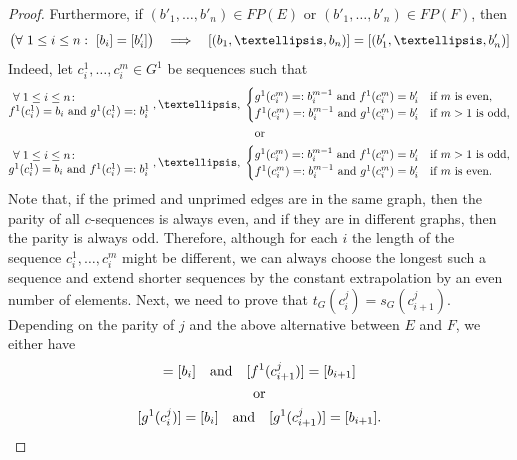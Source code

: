 \documentclass[10pt,a4paper]{amsart}
\def\text{\hbox}
\begin{document}
\begin{proof}
Furthermore, if $(b'_1,\ldots,b'_n)\in FP(E)$ or $(b'_1,\ldots,b'_n)\in FP(F)$, then 
\begin{equation}\label{implication}
\big{(}\forall~1\leq i\leq n:~[b_i]=[b'_i]\big{)}\quad \Longrightarrow\quad [(b_1,\ldots,b_n)]=[(b'_1,\ldots,b'_n)]
\end{equation}
Indeed, let $c^1_i,\ldots,c^{m}_i\in G^1$ be  sequences such that
\begin{gather}
\begin{matrix}
\forall\;1\leq i\leq n\colon\phantom{xxxxxxxxxx}\\
 f^1(c^1_i)=b_i\text{ and } g^1(c^1_i)=:b^1_i
\end{matrix}
\;,\ldots,\;
\begin{cases}
g^1(c^{m}_i)=:b^{m-1}_i\text{ and } f^1(c^{m}_i)=b'_i&\text{if $m$ is even},\\
f^1(c^{m}_i)=:b^{m-1}_i\text{ and } g^1(c^{m}_i)=b'_i&\text{if $m> 1$ is odd},
\end{cases}\nonumber\\
\text{or}\nonumber\\
\begin{matrix}
\forall\;1\leq i\leq n\colon\phantom{xxxxxxxxxx}\\
 g^1(c^1_i)=b_i\text{ and } f^1(c^1_i)=:b^1_i
\end{matrix}
\;,\ldots,\;
\begin{cases}
g^1(c^{m}_i)=:b^{m-1}_i\text{ and } f^1(c^{m}_i)=b'_i&\text{if $m>1$ is odd},\\
f^1(c^{m}_i)=:b^{m-1}_i\text{ and } g^1(c^{m}_i)=b'_i&\text{if $m$ is even}.
\end{cases}
\end{gather}
Note that, if the primed and unprimed edges are in the same graph, then the parity of all $c$-sequences is always even, and if they are in different graphs, then the parity is always odd. Therefore, although for each $i$ the length of the sequence $c^1_i,\ldots,c^{m}_i$ might be
different, we can always choose the longest such a sequence and extend shorter sequences by the constant extrapolation by an even number of elements. Next, we need to prove that $t_G(c^j_i)=s_G(c^j_{i+1})$. 
Depending on the parity of $j$ and the
above alternative between $E$ and $F$, we either have 
\begin{gather}
[f^1(c^j_i)]=[b_i]\quad\text{and}\quad [f^1(c^j_{i+1})]=[b_{i+1}]\nonumber\\
\text{or}\nonumber\\
[g^1(c^j_i)]=[b_i]\quad\text{and}\quad[g^1(c^j_{i+1})]=[b_{i+1}].

\end{gather}
\end{proof}
\end{document}
